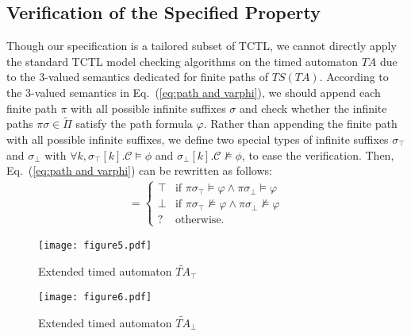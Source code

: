 \documentclass[10pt,conference,compsocconf,letterpaper]{IEEEtran}
\begin{document}
\subsection{Verification of the Specified Property}\label{sec:Detection over TA}

Though our specification is a tailored subset of TCTL, we cannot directly apply the standard TCTL model checking algorithms on the timed automaton $TA$ due to the 3-valued semantics dedicated for finite paths of $TS(TA)$. According to the 3-valued semantics in Eq.~(\ref{eq:path and varphi}), we should append each finite path $\pi$ with all possible infinite suffixes $\sigma$ and check whether the infinite paths $\pi\sigma\in \widetilde{\Pi}$ satisfy the path formula $\varphi$. Rather than appending the finite path with all possible infinite suffixes, we define two special types of infinite suffixes $\sigma_\top$ and $\sigma_\bot$ with $\forall k, \sigma_\top[k].\mathcal{C} \models \phi$ and $\sigma_\bot[k].\mathcal{C}\not\models \phi$, to ease the verification. Then, Eq.~(\ref{eq:path and varphi}) can be rewritten as follows:
\begin{eqnarray}
[\pi \models \varphi] = \left\{ \begin{array}{ll}
\top & \textrm{if } \pi\sigma_\top\models\varphi \wedge \pi\sigma_\bot\models\varphi\\
\bot & \textrm{if } \pi\sigma_\top\not\models\varphi \wedge \pi\sigma_\bot\not\models\varphi\\
? & \textrm{otherwise.}
\end{array} \right.
\end{eqnarray}
\begin{figure}[tbp]
\begin{center}
  \texttt{[image: figure5.pdf]}
  \caption{Extended timed automaton $\widetilde{TA}_\top$}
  \label{F:extended true TA}
\end{center}
\end{figure}
\begin{figure}[tbp]
\begin{center}
  \texttt{[image: figure6.pdf]}
  \caption{Extended timed automaton $\widetilde{TA}_\bot$}
  \label{F:extended false TA}
\end{center}
\end{figure}
\end{document}
